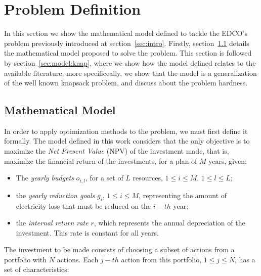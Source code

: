 \section{Problem Definition}
\label{sec:model}

In this section we show the mathematical model defined to tackle the EDCO's problem previously introduced at section~\ref{sec:intro}.
Firstly, section~\ref{sec:model:model} details the mathematical model proposed to solve the problem.
This section is followed by section~\ref{sec:model:knap}, where we show how the model defined relates 
to the available literature, more specificcally, we show that the model is a generalization of the 
well known knapsack problem, and discuss about the problem hardness.

\subsection{Mathematical Model}
\label{sec:model:model}

In order to apply optimization methods to the problem, we must first define it formally. 
The model defined in this work considers that the only objective is to maximize the 
\textit{Net Present Value} (NPV) of the investment made, that is, maximize the financial return
of the investments, for a plan of $M$ years, given:

\begin{itemize}
  \item The \textit{yearly budgets} $o_{i,l}$, for a set of $L$ resources, $1 \le i \le M$, $1 \le l \le L$;
  \item the \textit{yearly reduction goals} $g_i$, $1 \le i \le M$, representing the amount of electricity loss 
        that must be reduced on the $i-th$ year;
  \item the \textit{internal return rate} $r$, which represents the annual depreciation of the investment.
	This rate is constant for all years.
\end{itemize}

The investment to be made consists of choosing a subset of actions from a portfolio with $N$ actions.
Each $j-th$ action from this portfolio, $1 \le j \le N$, has a set of characteristics:


